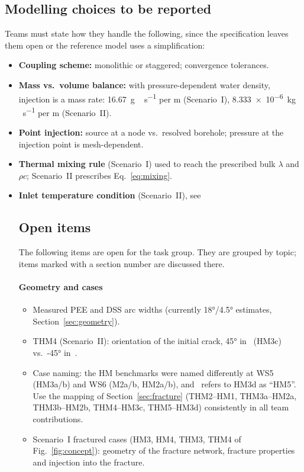 \documentclass[11pt,a4paper]{article}
\newcommand{\open}{$\square$}
\begin{document}
\subsection{Modelling choices to be reported}
Teams must state how they handle the following, since the specification leaves
them open or the reference model uses a simplification:
\begin{itemize}
  \item \textbf{Coupling scheme:} monolithic or staggered; convergence tolerances.
  \item \textbf{Mass vs.\ volume balance:} with pressure-dependent water
        density, injection is a mass rate: \SI{16.67}{g\,s^{-1}} per m
        (Scenario~I), \SI{8.333e-6}{kg\,s^{-1}} per m (Scenario~II).
  \item \textbf{Point injection:} source at a node vs.\ resolved borehole;
        pressure at the injection point is mesh-dependent.
  \item \textbf{Thermal mixing rule} (Scenario~I) used to reach the prescribed
        bulk $\lambda$ and $\rho c$; Scenario~II prescribes
        Eq.~\eqref{eq:mixing}.
  \item \textbf{Inlet temperature condition} (Scenario~II), see
        \subsection{Open items}
The following items are open for the task group. They are grouped by topic;
items marked with a section number are discussed there.

\paragraph{Geometry and cases}
\begin{itemize}[label=\open]
  \item Measured PEE and DSS arc widths (currently \ang{18}/\ang{4.5} estimates,
        Section~\ref{sec:geometry}).
  \item THM4 (Scenario~II): orientation of the initial crack, \ang{45}
        in~\cite{Mollaali2026} (HM3c) vs.\ \ang{-45} in~\cite{Pan2026}.
  \item Case naming: the HM benchmarks were named differently at WS5
        (HM3a/b) and WS6 (M2a/b, HM2a/b), and~\cite{Pan2026} refers to HM3d
        as ``HM5''. Use the mapping of Section~\ref{sec:fracture}
        (THM2--HM1, THM3a--HM2a, THM3b--HM2b, THM4--HM3c, THM5--HM3d)
        consistently in all team contributions.
  \item Scenario~I fractured cases (HM3, HM4, THM3, THM4 of
        Fig.~\ref{fig:concept}): geometry of the fracture network, fracture
        properties and injection into the fracture.
\end{itemize}


\end{itemize}
\end{document}
